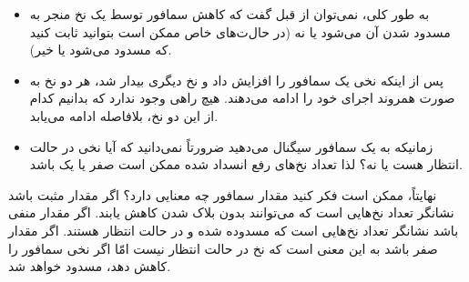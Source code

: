 \documentclass{book}
\begin{document}
\begin{itemize}

\item 
    به طور کلی، نمی‌توان از قبل گفت که کاهش سمافور توسط یک نخ منجر به مسدود شدن آن می‌شود یا نه 
    (در حال‌ت‌های خاص ممکن است بتوانید ثابت کنید که مسدود می‌شود یا خیر).


\item 
    پس از اینکه نخی یک سمافور را افزایش داد و نخ دیگری بیدار شد، هر دو نخ به صورت همروند اجرای خود را ادامه می‌دهند. 
    هیچ راهی وجود ندارد که بدانیم کدام از این دو نخ، بلافاصله ادامه می‌یابد. 

\item 
    زمانیکه به یک سمافور سیگنال می‌دهید ضرورتاً نمی‌دانید که آیا نخی در حالت انتظار هست یا نه؟ لذا تعداد نخ‌های رفع انسداد شده ممکن است 
    صفر یا یک باشد. 

\end{itemize}

    نهایتاً، ممکن است فکر کنید مقدار سمافور چه معنایی دارد؟ %
    اگر مقدار مثبت باشد نشانگر تعداد نخ‌هایی است که می‌توانند بدون بلاک شدن کاهش یابند. 
    اگر مقدار منفی باشد نشانگر تعداد نخ‌هایی است که مسدوده شده و در حالت انتظار هستند. 
    اگر مقدار صفر باشد به این معنی است که نخ در حالت انتظار نیست امّا اگر نخی سمافور را کاهش دهد، مسدود خواهد شد.
    

\end{document}
